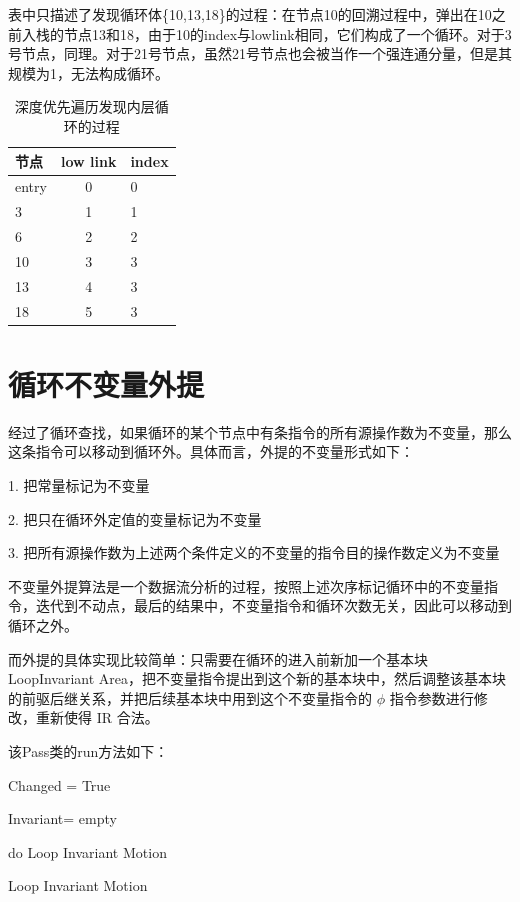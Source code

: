 表中只描述了发现循环体\{10,13,18\}的过程：在节点10的回溯过程中，弹出在10之前入栈的节点13和18，由于10的index与lowlink相同，它们构成了一个循环。对于3号节点，同理。对于21号节点，虽然21号节点也会被当作一个强连通分量，但是其规模为1，无法构成循环。

\begin{table}[htb]
  \centering\small
  \caption{深度优先遍历发现内层循环的过程}
  \label{tab:dfs}
  \begin{tabular}{lcl}
    \toprule
    节点   & low link & index                           \\
    \midrule
    entry & 0 & 0   \\
    3 & 1 & 1       \\
    6 & 2 & 2       \\
    10 & 3 & 3      \\
    13 & 4 & 3      \\
    18 & 5 & 3      \\
    \bottomrule
  \end{tabular}
\end{table}


\section{循环不变量外提}

经过了循环查找，如果循环的某个节点中有条指令的所有源操作数为不变量，那么这条指令可以移动到循环外。具体而言，外提的不变量形式如下：

1. 把常量标记为不变量

2. 把只在循环外定值的变量标记为不变量

3. 把所有源操作数为上述两个条件定义的不变量的指令目的操作数定义为不变量

不变量外提算法是一个数据流分析的过程，按照上述次序标记循环中的不变量指令，迭代到不动点，最后的结果中，不变量指令和循环次数无关，因此可以移动到循环之外。

而外提的具体实现比较简单：只需要在循环的进入前新加一个基本块 LoopInvariant Area，把不变量指令提出到这个新的基本块中，然后调整该基本块的前驱后继关系，并把后续基本块中用到这个不变量指令的 $\phi$ 指令参数进行修改，重新使得 IR 合法。

该Pass类的run方法如下：

\begin{algorithm}[htb]
  \small
  \SetAlgoLined
  Changed = True
  
  Invariant= empty
  
  do Loop Invariant Motion\;
  
  \caption{Loop Invariant Motion}
  \label{algo:loopinvar}
\end{algorithm}


